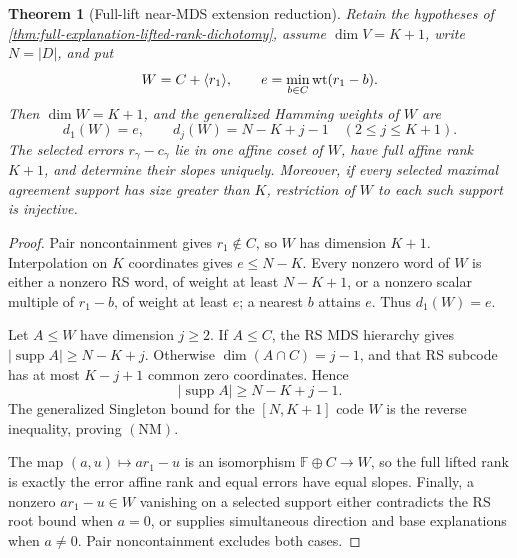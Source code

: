 \documentclass[11pt,a4paper]{amsart}
\numberwithin{equation}{section}
\newtheorem{theorem}{Theorem}[section]
\theoremstyle{remark}
\newcommand{\F}{\mathbb F}\newcommand{\B}{\mathbb B}\newcommand{\K}{\mathbb K}\newcommand{\Z}{\mathbb Z}
\begin{document}
\begin{theorem}[Full-lift near-MDS extension reduction]
\label{thm:full-lift-near-mds-extension}
Retain the hypotheses of
\cref{thm:full-explanation-lifted-rank-dichotomy}, assume
\(\dim V=K+1\), write \(N=|D|\), and put
\[
  W=C+\langle r_1\rangle,\qquad
  e=\min_{b\in C}\operatorname{wt}(r_1-b).
\]
Then \(\dim W=K+1\), and the generalized Hamming weights of \(W\) are
\[
  d_1(W)=e,\qquad
  d_j(W)=N-K+j-1\quad(2\le j\le K+1).
  \tag{NM}
\]
The selected errors \(r_\gamma-c_\gamma\) lie in one affine coset of
\(W\), have full affine rank \(K+1\), and determine their slopes uniquely.
Moreover, if every selected maximal agreement support has size greater than
\(K\), restriction of \(W\) to each such support is injective.
\end{theorem}

\begin{proof}
Pair noncontainment gives \(r_1\notin C\), so \(W\) has dimension \(K+1\).
Interpolation on \(K\) coordinates gives \(e\le N-K\).  Every nonzero word
of \(W\) is either a nonzero RS word, of weight at least \(N-K+1\), or a
nonzero scalar multiple of \(r_1-b\), of weight at least \(e\); a nearest
\(b\) attains \(e\).  Thus \(d_1(W)=e\).

Let \(A\le W\) have dimension \(j\ge2\).  If \(A\le C\), the RS MDS
hierarchy gives \(|\operatorname{supp}A|\ge N-K+j\).  Otherwise
\(\dim(A\cap C)=j-1\), and that RS subcode has at most \(K-j+1\) common
zero coordinates.  Hence
\[
  |\operatorname{supp}A|\ge N-K+j-1.
\]
The generalized Singleton bound for the \([N,K+1]\) code \(W\) is the
reverse inequality, proving \((\mathrm{NM})\).

The map \((a,u)\mapsto ar_1-u\) is an isomorphism
\(\F\oplus C\to W\), so the full lifted rank is exactly the error affine
rank and equal errors have equal slopes.  Finally, a nonzero
\(ar_1-u\in W\) vanishing on a selected support either contradicts the RS
root bound when \(a=0\), or supplies simultaneous direction and base
explanations when \(a\ne0\).  Pair noncontainment excludes both cases.
\end{proof}
\end{document}
